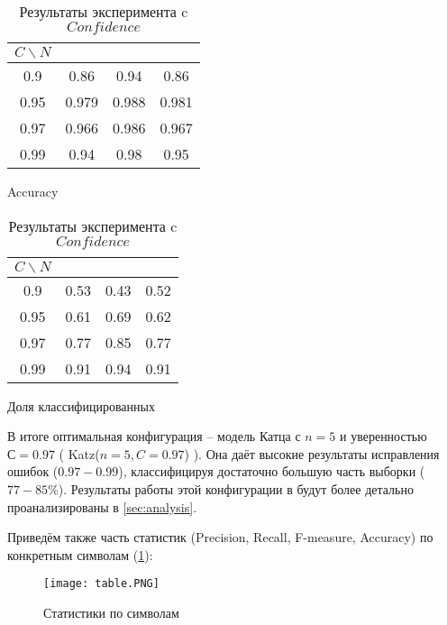 \vspace{20pt}
\begin{table}[H]
	\begin{center}

\begin{multicols}{2}
	\begin{tabular}{|c|c|c|c|}\hline
		$C \backslash N$ & \KG & \BS & \MX \\ \hline
		0.9 & 0.86 & 0.94 & 0.86 \\
		0.95 & 0.979 & 0.988 & 0.981 \\
		0.97 & 0.966  & 0.986 & 0.967  \\
		0.99 & 0.94 & 0.98 & 0.95 \\ \hline 	
	\end{tabular}
\caption*{Accuracy}

	\begin{tabular}{|c|c|c|c|}\hline
		$C \backslash N$ & \KG & \BS & \MX \\ \hline
		0.9 & 0.53 & 0.43 & 0.52 \\
		0.95 & 0.61 & 0.69 & 0.62 \\
		0.97 & 0.77 & 0.85  & 0.77  \\
		0.99 & 0.91 & 0.94 & 0.91 \\ \hline 	
	\end{tabular}
\caption*{Доля классифицированных}
\end{multicols}		
\caption{Результаты эксперимента c $Confidence$}
\label{table:exp1}
\end{center}
\end{table}

\vspace{20pt}

В итоге оптимальная конфигурация -- модель Катца с $n=5$ и уверенностью $С=0.97$ ( Katz($n=5, C=0.97$) ). Она даёт высокие результаты исправления ошибок ($0.97-0.99$), классифицируя достаточно большую часть выборки ($77-85 \%$). Результаты работы этой конфигурации в будут более детально проанализированы в \cref{sec:analysis}.

Приведём также часть статистик (Precision, Recall, F-measure, Accuracy) по конкретным символам (\cref{fig:ss}):

\begin{figure}[H]
	\begin{center}
		\texttt{[image: table.PNG]}
		\caption{Статистики по символам}
		\label{fig:ss}
	\end{center}
\end{figure}

